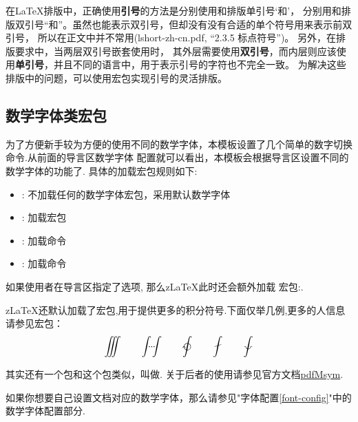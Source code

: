 在\LaTeX{}排版中，正确使用{\bf 引号}的方法是分别使用和\cmd{\'}排版单引号`和'，
分别用和\cmd{\'\'}排版双引号``和''。虽然也能表示双引号，但却没有没有合适的单个符号用来表示前双引号，
所以在正文中并不常用(lshort-zh-cn.pdf, “2.3.5 标点符号”)。 另外，在排版要求中，当两层双引号嵌套使用时，
其外层需要使用{\bf 双引号}，而内层则应该使用{\bf 单引号}，并且不同的语言中，用于表示引号的字符也不完全一致。
为解决这些排版中的问题，可以使用宏包实现引号的灵活排版。

\subsection{数学字体类宏包}
为了方便新手较为方便的使用不同的数学字体，本模板设置了几个简单的数字切换命令.从前面的导言区数学字体
配置就可以看出，本模板会根据导言区设置不同的数学字体的功能了. 具体的加载宏包规则如下:
\begin{itemize}
    \item {}: 不加载任何的数学字体宏包，采用默认数学字体
    \item {}: 加载宏包 
    \item {}: 加载命令 
    \item {}: 加载命令 \par
\end{itemize}

如果使用者在导言区指定了选项, 那么z\LaTeX{}此时还会额外加载
宏包:.

z\LaTeX{}还默认加载了宏包,用于提供更多的积分符号.下面仅举几例,更多的人信息请参见宏包：
\[
    \iiint\qquad 
    \idotsint\qquad
    \ointclockwise\qquad
    \fint\qquad
    \landdownint
\]

其实还有一个包和这个包类似，叫做. 关于后者的使用请参见官方文档\href{https://mirror-hk.koddos.net/CTAN/macros/generic/pdfmsym/pdfmsym-doc.pdf}{pdfMsym}.

\begin{leftbar}
如果你想要自己设置文档对应的数学字体，那么请参见"字体配置\cref{font-config}"中的数学字体配置部分.
\end{leftbar}

